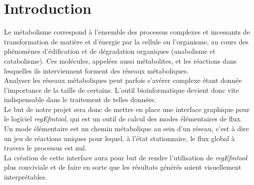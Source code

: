 \chapter*{Introduction}

Le métabolisme correspond à l'ensemble des processus complexes et incessants de transformation de matière et d'énergie par la cellule ou l'organisme, au cours des phénomènes d'édification et de dégradation organiques (anabolisme et catabolisme). 
Ces molécules, appelées aussi métabolites, et les réactions dans lesquelles ils interviennent forment des réseaux métaboliques. \\

Analyser les réseaux métaboliques peut parfois s'avérer complexe étant donnée l'importance de la taille de certains. L'outil bioinformatique devient donc vite indispensable dans le traitement de telles données.\\ 
Le but de notre projet sera donc de mettre en place une interface graphique pour le logiciel \emph{regEfmtool}, qui est un outil de calcul des modes élémentaires de flux.
Un mode élémentaire est un chemin métabolique au sein d'un réseau, c'est à dire un jeu de réactions uniques pour lequel, à l'état stationnaire, le flux global à travers le processus est nul.\\
La création de cette interface aura pour but de rendre l'utilisation de \emph{regEfmtool} plus conviviale et de faire en sorte que les résultats générés soient visuellement interprétables. 
